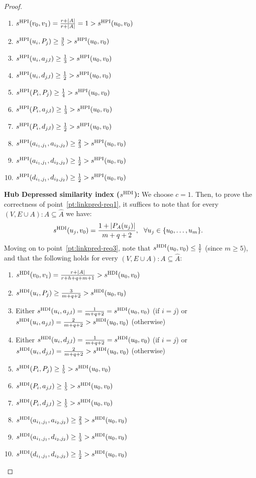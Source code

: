 \documentclass[twocolumn]{article}
\newcommand{\FA}{\widehat{A}}
\newcommand{\PA}{P_{A}}
\newcommand{\sHPI}{s^{\text{\normalfont HPI}}}
\newcommand{\sHDI}{s^{\text{\normalfont HDI}}}
\begin{document}
\begin{proof}
\begin{enumerate}[label=(\roman*),leftmargin=*]\itemsep0.4em
\item $\sHPI(v_0,v_1)=\frac{r+|A|}{r+|A|}=1 > \sHPI(u_0,v_0)$
\item $\sHPI(u_i,P_j) \geq \frac{3}{5} > \sHPI(u_0,v_0)$
\item $\sHPI(u_i,a_{j,l}) \geq \frac{1}{3} > \sHPI(u_0,v_0)$
\item $\sHPI(u_i,d_{j,l}) \geq \frac{1}{2} > \sHPI(u_0,v_0)$
\item $\sHPI(P_i,P_j) \geq \frac{1}{4} > \sHPI(u_0,v_0)$
\item $\sHPI(P_i,a_{j,l}) \geq \frac{1}{3} > \sHPI(u_0,v_0)$
\item $\sHPI(P_i,d_{j,l}) \geq \frac{1}{2} > \sHPI(u_0,v_0)$
\item $\sHPI(a_{i_1,j_1},a_{i_2,j_2}) \geq \frac{2}{3} > \sHPI(u_0,v_0)$
\item $\sHPI(a_{i_1,j_1},d_{i_2,j_2}) \geq \frac{1}{2} > \sHPI(u_0,v_0)$
\item $\sHPI(d_{i_1,j_1},d_{i_2,j_2}) \geq \frac{1}{2} > \sHPI(u_0,v_0)$
\end{enumerate}

\noindent \textbf{Hub Depressed similarity index ($\sHDI$):} We choose $c=1$. Then, to prove the correctness of point~\ref{pt:linkpred-req1}, it suffices to note that for every $(V,E\cup A):A \subseteq \FA$ we have: $$
\sHDI(u_j,v_0)=\frac{1+|\PA(u_j)|}{m+q+2},\ \ \forall u_j\in\{u_0,\ldots, u_m\}.
$$
Moving on to point~\ref{pt:linkpred-req3}, note that $\sHDI(u_0,v_0) \leq \frac{1}{7}$ (since $m \geq 5$), and that the following holds for every $(V,E\cup A):A \subseteq \FA$:

\begin{enumerate}[label=(\roman*),leftmargin=*]\itemsep0.4em
\item $\sHDI(v_0,v_1)=\frac{r+|A|}{r+h+q+m+1} > \sHDI(u_0,v_0)$
\item $\sHDI(u_i,P_j) \geq \frac{3}{m+q+2} > \sHDI(u_0,v_0)$
\item Either $\sHDI(u_i,a_{j,l}) = \frac{1}{m+q+2} = \sHDI(u_0,v_0)$ (if $i=j$) or $\sHDI(u_i,a_{j,l}) = \frac{2}{m+q+2} > \sHDI(u_0,v_0)$ (otherwise)
\item Either $\sHDI(u_i,d_{j,l}) = \frac{1}{m+q+2} = \sHDI(u_0,v_0)$ (if $i=j$) or $\sHDI(u_i,d_{j,l}) = \frac{2}{m+q+2} > \sHDI(u_0,v_0)$ (otherwise)
\item $\sHDI(P_i,P_j) \geq \frac{1}{5} > \sHDI(u_0,v_0)$
\item $\sHDI(P_i,a_{j,l}) \geq \frac{1}{5} > \sHDI(u_0,v_0)$
\item $\sHDI(P_i,d_{j,l}) \geq \frac{1}{5} > \sHDI(u_0,v_0)$
\item $\sHDI(a_{i_1,j_1},a_{i_2,j_2}) \geq \frac{2}{3} > \sHDI(u_0,v_0)$
\item $\sHDI(a_{i_1,j_1},d_{i_2,j_2}) \geq \frac{1}{3} > \sHDI(u_0,v_0)$
\item $\sHDI(d_{i_1,j_1},d_{i_2,j_2}) \geq \frac{1}{2} > \sHDI(u_0,v_0)$
\end{enumerate}


\end{proof}
\end{document}
